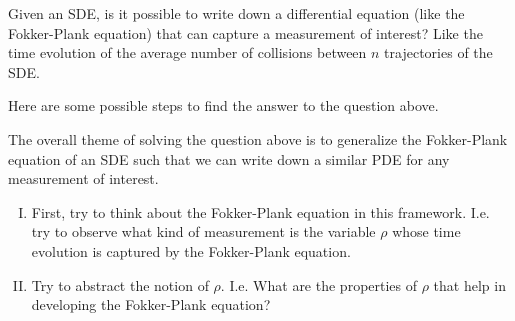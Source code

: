 \begin{openQuestion}
	Given an SDE, is it possible to write down a differential equation (like the Fokker-Plank equation) that can capture a measurement of interest? Like the time evolution of the average number of collisions between $ n $ trajectories of the SDE.
\end{openQuestion}
Here are some possible steps to find the answer to the question above.
\begin{observation}
	The overall theme of solving the question above is to generalize the Fokker-Plank equation of an SDE such that we can write down a similar PDE for any measurement of interest. 
	\begin{enumerate}[(I)]
		\item First, try to think about the Fokker-Plank equation in this framework. I.e. try to observe what kind of measurement is the variable $ \rho $ whose time evolution is captured by the Fokker-Plank equation.
		\item Try to abstract the notion of $ \rho $. I.e. What are the properties of $ \rho $ that help in developing the Fokker-Plank equation?
	\end{enumerate}
\end{observation}


